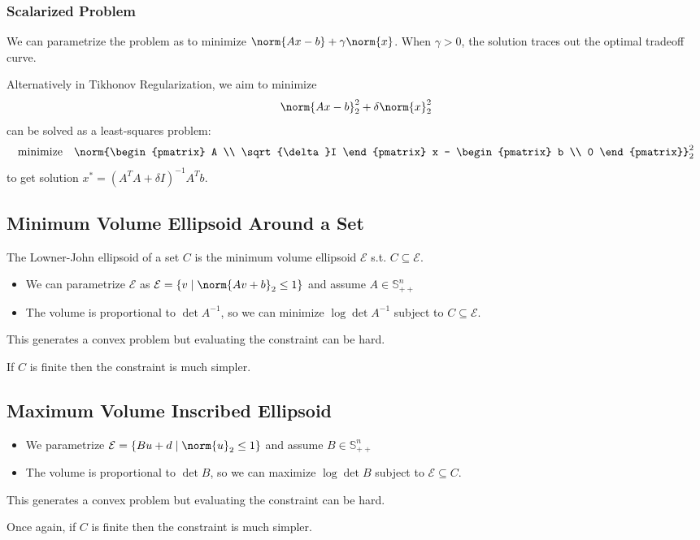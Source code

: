 \documentclass[11pt]{article}
\begin{document}
\subsubsection*{Scalarized Problem}
We can parametrize the problem as to minimize $\norm{Ax - b} + \gamma \norm{x}$. When $\gamma > 0$, the solution traces out the optimal tradeoff curve. \par 

Alternatively in Tikhonov Regularization, we aim to minimize 
\[ \norm{Ax - b}_2^2 + \delta \norm{x}_2^2 \] 
can be solved as a least-squares problem: 
\[ \text{minimize} \quad \norm{\begin{pmatrix}
    A \\ \sqrt{\delta}I
\end{pmatrix} x - \begin{pmatrix}
    b \\ 0
\end{pmatrix}}_2^2 \] 
to get solution $x^* = (A^TA + \delta I)^{-1}A^Tb$. 

\subsection{Minimum Volume Ellipsoid Around a Set} 
The Lowner-John ellipsoid of a set $C$ is the minimum volume ellipsoid $\mathcal{E}$ s.t. $C \subseteq \mathcal{E}$. 
\begin{itemize}
    \item We can parametrize $\mathcal{E}$ as $\mathcal{E} = \left\{ v \mid \norm{Av + b}_2 \leq 1 \right\}$ and assume $A \in \mathbb{S}_{++}^n$
    \item The volume is proportional to $\det A^{-1}$, so we can minimize $\log \det A^{-1}$ subject to $C \subseteq \mathcal{E}$.
\end{itemize}
This generates a convex problem but evaluating the constraint can be hard. \par 
If $C$ is finite then the constraint is much simpler. 

\subsection{Maximum Volume Inscribed Ellipsoid}
\begin{itemize}
    \item We parametrize $\mathcal{E} = \left\{ Bu + d \mid \norm{u}_2 \leq 1 \right\}$ and assume $B \in \mathbb{S}_{++}^n$
    \item The volume is proportional to $\det B$, so we can maximize $\log \det B$ subject to $\mathcal{E} \subseteq C$.
\end{itemize}
This generates a convex problem but evaluating the constraint can be hard. \par
Once again, if $C$ is finite then the constraint is much simpler. \par 
\end{document}
